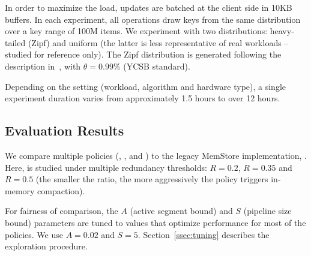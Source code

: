 In order to maximize the load, updates are batched at the client side in 10KB buffers. 
In each experiment, all operations draw keys from the same distribution over a key range
of 100M items. We experiment with two distributions: heavy-tailed (Zipf) and uniform (the latter 
is less representative of real workloads -- studied for reference only). The Zipf distribution 
is generated following the description in~\cite{Gray:1994:QGB:191839.191886}, with $\theta=0.99\%$ 
(YCSB standard).

Depending on the setting (workload, algorithm and hardware type), a single experiment duration varies 
from approximately 1.5 hours to over 12 hours.  

\subsection{Evaluation Results}
\label{ssec:results}

We compare multiple \sys\/ policies (\basic, \eager, and \adp\/) to the legacy MemStore implementation,
\none. Here, \adp\/ is studied under multiple 
redundancy thresholds: $R=0.2$, $R=0.35$ and $R=0.5$ (the smaller the ratio, the more aggressively
the policy triggers in-memory compaction).  

For fairness of comparison, the $A$ (active segment bound) and $S$ (pipeline size bound) parameters 
are tuned to values that optimize performance for most of the policies. We use $A=0.02$ and $S=5$.
Section~\ref{ssec:tuning} describes the exploration procedure. 

